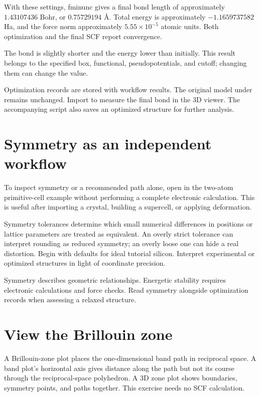 With these settings, fminunc gives a final bond length of approximately $1.43107436$ Bohr, or $0.75729194$ Å. Total energy is approximately $-1.1659737582$ Ha, and the force norm approximately $5.55\times10^{-5}$ atomic units. Both optimization and the final SCF report convergence.

The bond is slightly shorter and the energy lower than initially. This result belongs to the specified box, functional, pseudopotentials, and cutoff; changing them can change the value.

Optimization records are stored with workflow results. The original model under  remains unchanged. Import  to measure the final bond in the 3D viewer. The accompanying script also saves an optimized structure for further analysis.

\section{Symmetry as an independent workflow}

To inspect symmetry or a recommended path alone, open  in the two-atom primitive-cell example without performing a complete electronic calculation. This is useful after importing a crystal, building a supercell, or applying deformation.

Symmetry tolerances determine which small numerical differences in positions or lattice parameters are treated as equivalent. An overly strict tolerance can interpret rounding as reduced symmetry; an overly loose one can hide a real distortion. Begin with defaults for ideal tutorial silicon. Interpret experimental or optimized structures in light of coordinate precision.

Symmetry describes geometric relationships. Energetic stability requires electronic calculations and force checks. Read symmetry alongside optimization records when assessing a relaxed structure.

\section{View the Brillouin zone}\label{sec:bz-workflow}

A Brillouin-zone plot places the one-dimensional band path in reciprocal space. A band plot's horizontal axis gives distance along the path but not its course through the reciprocal-space polyhedron. A 3D zone plot shows boundaries, symmetry points, and paths together. This exercise needs no SCF calculation.

